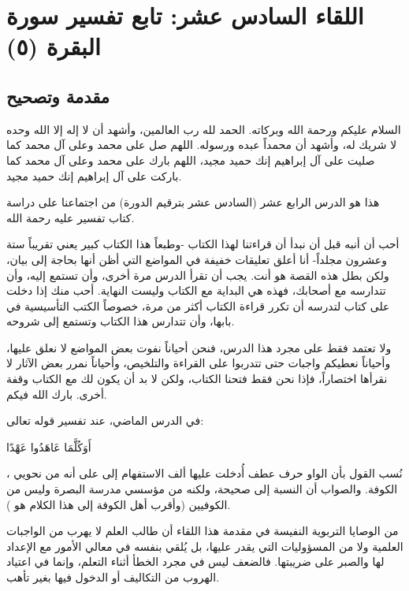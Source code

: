 \chapter{اللقاء السادس عشر: تابع تفسير سورة البقرة (٥)}

\section{مقدمة وتصحيح}
السلام عليكم ورحمة الله وبركاته. الحمد لله رب العالمين، وأشهد أن لا إله إلا الله وحده لا شريك له، وأشهد أن محمداً عبده ورسوله. اللهم صل على محمد وعلى آل محمد كما صليت على آل إبراهيم إنك حميد مجيد، اللهم بارك على محمد وعلى آل محمد كما باركت على آل إبراهيم إنك حميد مجيد.

هذا هو الدرس الرابع عشر (السادس عشر بترقيم الدورة) من اجتماعنا على دراسة كتاب تفسير  عليه رحمة الله. 

أحب أن أنبه قبل أن نبدأ أن قراءتنا لهذا الكتاب -وطبعاً هذا الكتاب كبير يعني تقريباً ستة وعشرون مجلداً- أنا أعلق تعليقات خفيفة في المواضع التي أظن أنها بحاجة إلى بيان، ولكن بطل هذه القصة هو أنت. يجب أن تقرأ الدرس مرة أخرى، وأن تستمع إليه، وأن تتدارسه مع أصحابك، فهذه هي البداية مع الكتاب وليست النهاية. أحب منك إذا دخلت على كتاب لتدرسه أن تكرر قراءة الكتاب أكثر من مرة، خصوصاً الكتب التأسيسية في بابها، وأن تتدارس هذا الكتاب وتستمع إلى شروحه. 

ولا تعتمد فقط على مجرد هذا الدرس، فنحن أحياناً نفوت بعض المواضع لا نعلق عليها، وأحياناً نعطيكم واجبات حتى تتدربوا على القراءة والتلخيص، وأحياناً نمرر بعض الآثار لا نقرأها اختصاراً، فإذا نحن فقط فتحنا الكتاب، ولكن لا بد أن يكون لك مع الكتاب وقفة أخرى. بارك الله فيكم.

\begin{fawaid}
في الدرس الماضي، عند تفسير قوله تعالى: \begin{ayah}أَوَكُلَّمَا عَاهَدُوا عَهْدًا\end{ayah}، نُسب القول بأن الواو حرف عطف أُدخلت عليها ألف الاستفهام إلى  على أنه من نحويي الكوفة. والصواب أن النسبة إلى  صحيحة، ولكنه من مؤسسي مدرسة البصرة وليس من الكوفيين (وأقرب أهل الكوفة إلى هذا الكلام هو ).
\end{fawaid}

\begin{fawaid}
من الوصايا التربوية النفيسة في مقدمة هذا اللقاء أن طالب العلم لا يهرب من الواجبات العلمية ولا من المسؤوليات التي يقدر عليها، بل يُلقي بنفسه في معالي الأمور مع الإعداد لها والصبر على ضريبتها. فالضعف ليس في مجرد الخطأ أثناء التعلم، وإنما في اعتياد الهروب من التكاليف أو الدخول فيها بغير تأهب.
\end{fawaid}

